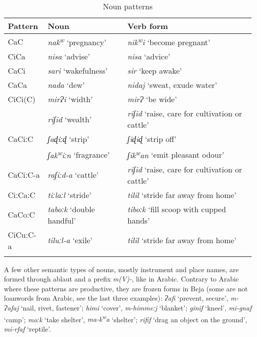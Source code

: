 \documentclass[output=paper]{langsci/langscibook}
\begin{document}
\begin{table}
\begin{tabularx}{\textwidth}{llQ}
\lsptoprule
Pattern & Noun & Verb form\\
\midrule
CaC & \textit{nak\textsuperscript{w}} ‘pregnancy’ & \textit{nik\textsuperscript{w}}\textit{i} ‘become pregnant’\\
CiCa & \textit{nisa} ‘advise’ & \textit{nisa} ‘advice’\\
CaCi & \textit{sari} ‘wakefulness’ & \textit{sir} ‘keep awake’\\
CaCa & \textit{nada} ‘dew’ & \textit{nidaj} ‘sweat, exude water’\\
CiCi(C) & \textit{mirɁi} ‘width’ & \textit{mirɁ} ‘be wide’\\
& \textit{riʃid} ‘wealth’ & \textit{riʃid} ‘raise, care for cultivation or cattle’\\
CaCiːC & \textit{ʃaɖiːɖ} ‘strip’ & \textit{ʃiɖiɖ} ‘strip off’\\
& \textit{ʃak\textsuperscript{w}}\textit{iːn} ‘fragrance’ & \textit{ʃik\textsuperscript{w}}\textit{an} ‘emit pleasant odour’\\
CaCiːC-a & \textit{raʃiːd-a} ‘cattle’ & \textit{riʃid} ‘raise, care for cultivation or cattle’\\
CiːCaːC & \textit{tiːlaːl} ‘stride’ & \textit{tilil} ‘stride far away from home’\\
CaCoːC & \textit{taboːk} ‘double handful’ & \textit{tiboːk} ‘fill scoop with cupped hands’\\
CiCuːC-a & \textit{tiluːl-a} ‘exile’ & \textit{tilil} ‘stride far away from home’\\
\lspbottomrule
\end{tabularx} 
\caption{Noun patterns}
\label{tab:vanhove:nounpat}
\end{table}


 
 
 




A few other semantic types of nouns, mostly instrument and place names, are formed through ablaut and a prefix \textit{m(V)-}, like in Arabic. Contrary to Arabic where these patterns are productive, they are frozen forms in Beja (some are not loanwords from Arabic, see the last three examples): \textit{Ɂafi} ‘prevent, secure’, \textit{m\nobreakdash-Ɂafaj} ‘nail, rivet, fastener’; \textit{himi} ‘cover’, \textit{m-himmeːj} ‘blanket’; \textit{ginif} ‘kneel’, \textit{mi-gnaf} ‘camp’; \textit{moːk} ‘take shelter’, \textit{ma\nobreakdash-k\textsuperscript{w}}\textit{a} ‘shelter’; \textit{rifif} ‘drag an object on the ground’, \textit{mi-rfaf} ‘reptile’.
\end{document}
